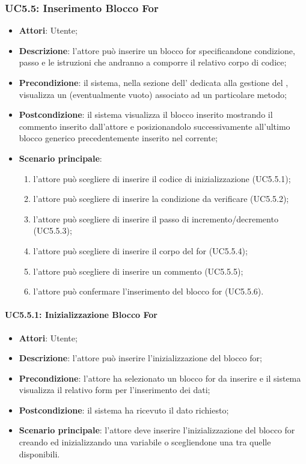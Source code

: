 \subsubsection{UC5.5: Inserimento Blocco For}
\label{UC5.5}
\begin{itemize}
\item \textbf{Attori}: Utente;
\item \textbf{Descrizione}: l'attore può inserire un blocco for specificandone condizione, passo e le istruzioni che andranno a comporre il relativo corpo di codice;	
\item \textbf{Precondizione}: il sistema, nella sezione dell' dedicata alla gestione del , visualizza un  (eventualmente vuoto) associato ad un particolare metodo;	
\item \textbf{Postcondizione}: il sistema visualizza il blocco inserito mostrando il commento inserito dall'attore e posizionandolo successivamente all'ultimo blocco generico precedentemente 
inserito nel  corrente;	
\item \textbf{Scenario principale}:
\begin{enumerate}
\item l'attore può scegliere di inserire il codice di inizializzazione (UC5.5.1);
\item l'attore può scegliere di inserire la condizione da verificare (UC5.5.2);
\item l'attore può scegliere di inserire il passo di incremento/decremento (UC5.5.3);
\item l'attore può scegliere di inserire il corpo del for (UC5.5.4);
\item l'attore può scegliere di inserire un commento (UC5.5.5);
\item l'attore può confermare l'inserimento del blocco for (UC5.5.6).
\end{enumerate}
\end{itemize}

\paragraph{UC5.5.1: Inizializzazione Blocco For}
\label{UC5.5.1}
\begin{itemize}
\item \textbf{Attori}: Utente;
\item \textbf{Descrizione}: l'attore può inserire l'inizializzazione del blocco for;
\item \textbf{Precondizione}:  l'attore ha selezionato un blocco for da inserire e il sistema visualizza il relativo form per l'inserimento dei dati;	
\item \textbf{Postcondizione}: il sistema ha ricevuto il dato richiesto;	
\item \textbf{Scenario principale}:
l'attore deve inserire l'inizializzazione del blocco for creando ed inizializzando una variabile o scegliendone una tra quelle disponibili.
\end{itemize}

